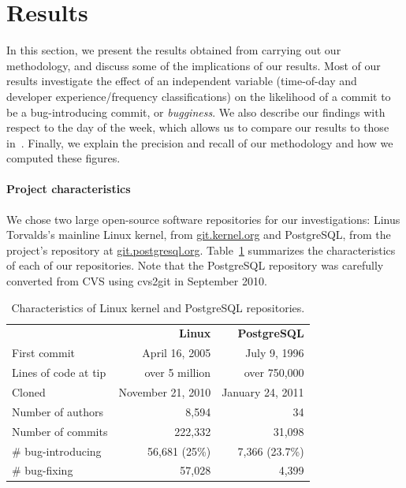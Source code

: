 \section{Results}
\label{sec-results}
In this section, we present the results obtained from carrying out our
methodology, and discuss some of the implications of our results.
Most of our results investigate the effect of an independent variable
(time-of-day and developer experience/frequency classifications) on
the likelihood of a commit to be a bug-introducing commit, or
\emph{bugginess}. We also
describe our findings with respect to the day of the week, which
allows us to compare our results to those
in~\cite{sliwerski-msr-2005}.  Finally, we explain the precision and
recall of our methodology and how we computed these figures.

\paragraph{Project characteristics}
We chose two large open-source software repositories for our
investigations: Linus Torvalds's mainline Linux kernel, from
\url{git.kernel.org} and PostgreSQL, from the project's repository at
\url{git.postgresql.org}.  Table~\ref{tab:characteristics} summarizes
the characteristics of each of our repositories. Note that the
PostgreSQL repository was carefully converted from CVS using {\code cvs2git} in
September 2010.

\begin{table}
\begin{tabular}{lrr}
& {\bf Linux} & {\bf PostgreSQL} \\
First commit & April 16, 2005 & July 9, 1996 \\
Lines of code at tip & over 5 million & over 750,000 \\
Cloned & November 21, 2010 & January 24, 2011 \\
Number of authors & 8,594 & 34 \\
Number of commits & 222,332 & 31,098 \\
\# bug-introducing & 56,681 (25\%) & 7,366 (23.7\%) \\
\# bug-fixing & 57,028 & 4,399
\end{tabular}
\caption{\label{tab:characteristics}Characteristics of Linux kernel and PostgreSQL repositories.}
\end{table}


